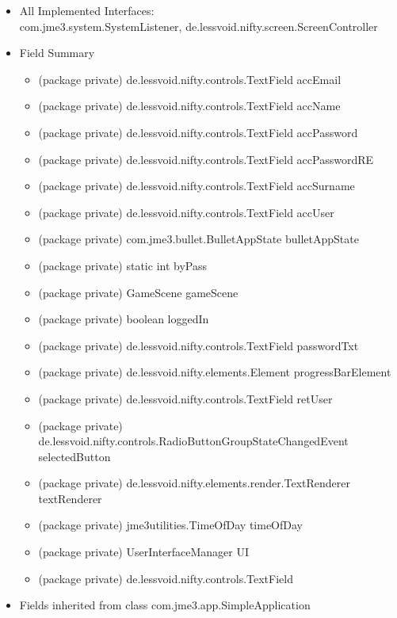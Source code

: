 \documentclass[letterpaper]{article}
\begin{document}
				\begin{itemize}
					\item 	All Implemented Interfaces: \\
							com.jme3.system.SystemListener, de.lessvoid.nifty.screen.ScreenController
					\item	Field Summary
							\begin{itemize}
								\item	(package private) de.lessvoid.nifty.controls.TextField	accEmail 
								\item	(package private) de.lessvoid.nifty.controls.TextField	accName 
								\item	(package private) de.lessvoid.nifty.controls.TextField	accPassword 
								\item	(package private) de.lessvoid.nifty.controls.TextField	accPasswordRE 
								\item	(package private) de.lessvoid.nifty.controls.TextField	accSurname 
								\item	(package private) de.lessvoid.nifty.controls.TextField	accUser 
								\item	(package private) com.jme3.bullet.BulletAppState	bulletAppState 
								\item	(package private) static int	byPass 
								\item	(package private) GameScene	gameScene 
								\item	(package private) boolean	loggedIn 
								\item	(package private) de.lessvoid.nifty.controls.TextField	passwordTxt 
								\item	(package private) de.lessvoid.nifty.elements.Element	progressBarElement 
								\item	(package private) de.lessvoid.nifty.controls.TextField	retUser 
								\item	(package private) de.lessvoid.nifty.controls.RadioButtonGroupStateChangedEvent	selectedButton 
								\item	(package private) de.lessvoid.nifty.elements.render.TextRenderer	textRenderer 
								\item	(package private) jme3utilities.TimeOfDay	timeOfDay 
								\item	(package private) UserInterfaceManager	UI 
								\item	(package private) de.lessvoid.nifty.controls.TextField
							\end{itemize} 
					\item	Fields inherited from class com.jme3.app.SimpleApplication \\

\end{itemize}
\end{document}
